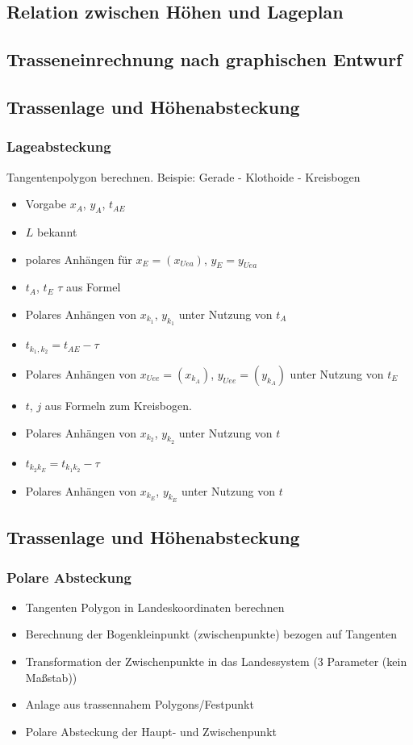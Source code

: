 \documentclass[12pt]{article}
\begin{document}
\subsection{Relation zwischen Höhen und Lageplan}
\subsection{Trasseneinrechnung nach graphischen Entwurf}
\subsection{Trassenlage und Höhenabsteckung}
\subsubsection{Lageabsteckung}
Tangentenpolygon berechnen. \newline
Beispie: Gerade - Klothoide - Kreisbogen 
\begin{itemize}
\item Vorgabe $x_A$, $y_A$, $t_{AE}$
\item $L$ bekannt
\item polares Anhängen für $x_E = (x_{Uea})$, $y_E = {y_{Uea}}$
\item $t_A$, $t_E$ $\tau$ aus Formel
\item Polares Anhängen von $x_{k_1}$, $y_{k_1}$ unter Nutzung von $t_A$
\item $t_{k_1, k_2} = t_{AE} - \tau$
\item Polares Anhängen von $x_{Uee} = (x_{k_A})$, $y_{Uee} = (y_{k_A})$ unter Nutzung von $t_E$ 
\item $t$, $j$ aus Formeln zum Kreisbogen.
\item Polares Anhängen von $x_{k_2}$, $y_{k_2}$ unter Nutzung von $t$
\item $t_{k_2 k_E} = t_{k_1 k_2} - \tau$
\item Polares Anhängen von $x_{k_E}$, $y_{k_E}$ unter Nutzung von $t$
\end{itemize}
\subsection{Trassenlage und Höhenabsteckung}
\subsubsection{Polare Absteckung}
\begin{itemize}
\item Tangenten Polygon in Landeskoordinaten berechnen
\item Berechnung der Bogenkleinpunkt (zwischenpunkte) bezogen auf Tangenten
\item Transformation der Zwischenpunkte in das Landessystem (3 Parameter (kein Maßstab))
\item Anlage aus trassennahem Polygons/Festpunkt
\item Polare Absteckung der Haupt- und Zwischenpunkt
\end{itemize}
\end{document}

